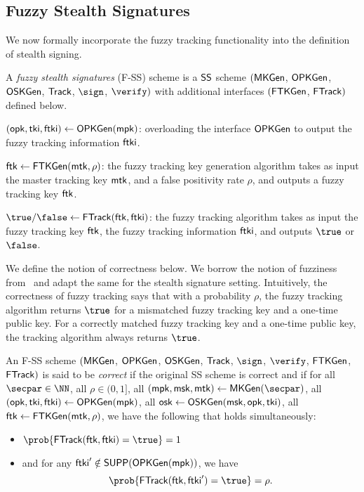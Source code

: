 \subsection{Fuzzy Stealth Signatures}
\label{sec:fuzzy-ss}
We now formally incorporate the fuzzy tracking functionality into the definition of stealth signing. 


\begin{definition}
A \emph{fuzzy stealth signatures} (F-SS) scheme is a $\mathsf{SS}$ scheme  $(\mathsf{MKGen}$, $\mathsf{OPKGen}$, $\mathsf{OSKGen}$, $\mathsf{Track}$, $\sign$, $\verify)$  with additional interfaces $(\mathsf{FTKGen}$, $\mathsf{FTrack})$ defined below.

\smallskip\noindent\underline{$(\mathsf{opk},\mathsf{tki},\mathsf{ftki}) \gets \mathsf{OPKGen}(\mathsf{mpk})$}: overloading the interface $\mathsf{OPKGen}$ to output the fuzzy tracking information $\mathsf{ftki}$.

\smallskip\noindent\underline{$\mathsf{ftk} \gets \mathsf{FTKGen}(\mathsf{mtk}, \rho)$}: the fuzzy tracking key generation algorithm takes as input the master tracking key $\mathsf{mtk}$, and a false positivity rate $\rho$, and outputs a fuzzy tracking key $\mathsf{ftk}$.

\smallskip\noindent\underline{$\true/\false \gets \ftrack(\ftk, \ftki)$}: the fuzzy tracking algorithm takes as input the fuzzy tracking key $\mathsf{ftk}$, the fuzzy tracking information $\mathsf{ftki}$, and outputs $\true$ or $\false$.

\end{definition}

We define the notion of correctness below. 
We borrow the notion of fuzziness from~\cite{CCS:BLMG21} and adapt the same for the stealth signature setting. Intuitively, the correctness of fuzzy tracking says that with a probability $\rho$, the fuzzy tracking algorithm returns $\true$ for a mismatched fuzzy tracking key and a one-time public key. 
For a correctly matched fuzzy tracking key and a one-time public key, the tracking algorithm always returns $\true$.



\begin{definition}\label{def:fuzzy-tracking-correct}
An F-SS scheme $(\mathsf{MKGen}$, $\mathsf{OPKGen}$, $\mathsf{OSKGen}$, $\mathsf{Track}$, $\sign$, $\verify$, $\mathsf{FTKGen}$, $\mathsf{FTrack})$ is said to be \emph{correct} if the original SS scheme is correct and if for all $\secpar \in \NN$, all $\rho \in (0,1]$, all $(\mpk, \msk, \mtk) \gets \mkgen(\secpar)$, all $(\mathsf{opk}, \mathsf{tki}, \mathsf{ftki}) \gets \mathsf{OPKGen}(\mathsf{mpk})$, all $\mathsf{osk} \gets \mathsf{OSKGen}(\mathsf{msk}, \mathsf{opk}, \mathsf{tki})$, all $\mathsf{ftk} \gets \mathsf{FTKGen}(\mathsf{mtk}, \rho)$, we have the following that holds simultaneously:
\begin{itemize}[leftmargin=*]
    \item $\prob{\ftrack(\ftk, \ftki) = \true} = 1$ 
    \item and for any $\mathsf{ftki}' \notin \mathsf{SUPP}(\mathsf{OPKGen}(\mathsf{mpk})) $, we have $$\prob{\ftrack(\ftk, \ftki') = \true} = \rho.$$
\end{itemize}

\end{definition}

